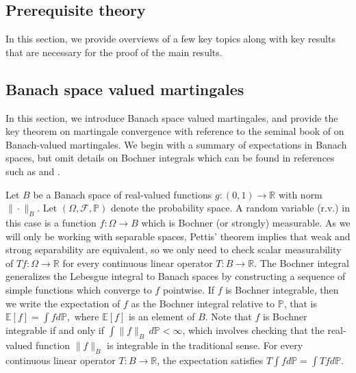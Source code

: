 \documentclass[11pt,a4paper]{article}
\newcommand{\R}{\mathbb{R}}
\newcommand{\E}{\mathbb{E}}
\begin{document}
\newpage
\begin{appendices}
\setcounter{equation}{0}
\renewcommand\theequation{A\arabic{equation}}
\setcounter{algocf}{0}
\renewcommand\thealgocf{A\arabic{algocf}}
\setcounter{figure}{0}
\renewcommand\thefigure{A\arabic{figure}}

\section{Prerequisite theory}\label{app:sec_prereq}
In this section, we provide overviews of a few key topics along with key results that are necessary for the proof of the main results. 

\subsection{Banach space valued martingales}\label{app:sec_ban_mart}

In this section, we introduce Banach space valued martingales, and provide the key theorem on martingale convergence with reference to the seminal book of \cite{Pisier2016} on Banach-valued martingales. 
We begin with a summary of expectations in Banach spaces, but omit details on Bochner integrals which can be found in references such as \cite{Yosida2012} and \cite{Hytonen2016}.

Let $B$ be a Banach space of real-valued functions $g:(0,1) \to \R$ with  norm $\|\cdot \|_B$. Let $(\Omega,\mathcal{F},\mathbb{P})$ denote the probability space. A random variable (r.v.) in this case is a function $f: \Omega \to B$ which is Bochner (or strongly) measurable. As we will only be working with separable spaces, Pettis' theorem implies that weak and strong separability are equivalent, so we only need to check scalar measurability of $Tf: \Omega \to \R$ for every continuous linear operator $T: B \to \R$.  
The Bochner integral generalizes the Lebesgue integral to Banach spaces by constructing a sequence of simple functions which converge to $f$ pointwise.
If $f$ is Bochner integrable, then we write the expectation of $f$ as the Bochner integral relative to $\mathbb{P}$, that is
$
\E[f] = \int f d\mathbb{P},
$
where $\E[f]$ is an element of $B$.
Note that $f$ is Bochner integrable if and only if $\int \|f\|_B \, d\mathbb{P} < \infty$, which involves checking that the real-valued function $\|f\|_B$ is integrable in the traditional sense. For every continuous linear operator $T: B \to \R$, the expectation satisfies
$
 T \int f d\mathbb{P}= \int Tf d\mathbb{P}.
$


\end{appendices}
\end{document}
